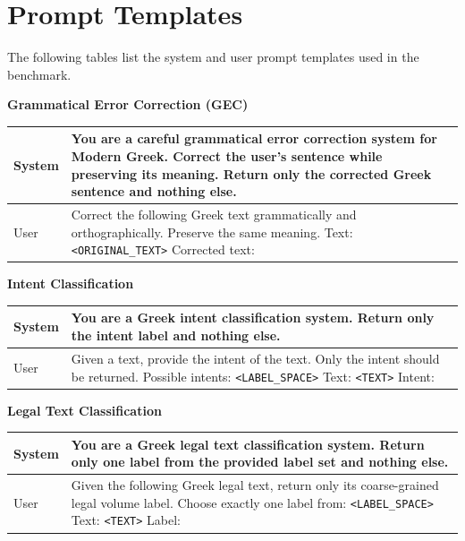 \documentclass[sigconf,review,anonymous]{acmart}
\begin{document}
\section{Prompt Templates}

The following tables list the system and user prompt templates used in the benchmark.

\begin{center}
\textbf{Grammatical Error Correction (GEC)}\par\smallskip
\small
\begin{tabularx}{\columnwidth}{p{}X}
\toprule
System & You are a careful grammatical error correction system for Modern Greek. Correct the user's sentence while preserving its meaning. Return only the corrected Greek sentence and nothing else. \\
\midrule
User & Correct the following Greek text grammatically and orthographically. Preserve the same meaning. \newline
Text: \texttt{<ORIGINAL\_TEXT>} \newline
Corrected text: \\
\bottomrule
\end{tabularx}
\end{center}

\begin{center}
\textbf{Intent Classification}\par\smallskip
\small
\begin{tabularx}{\columnwidth}{p{}X}
\toprule
System & You are a Greek intent classification system. Return only the intent label and nothing else. \\
\midrule
User & Given a text, provide the intent of the text. Only the intent should be returned. \newline
Possible intents: \texttt{<LABEL\_SPACE>} \newline
Text: \texttt{<TEXT>} \newline
Intent: \\
\bottomrule
\end{tabularx}
\end{center}

\begin{center}
\textbf{Legal Text Classification}\par\smallskip
\small
\begin{tabularx}{\columnwidth}{p{}X}
\toprule
System & You are a Greek legal text classification system. Return only one label from the provided label set and nothing else. \\
\midrule
User & Given the following Greek legal text, return only its coarse-grained legal volume label. Choose exactly one label from: \texttt{<LABEL\_SPACE>} \newline
Text: \texttt{<TEXT>} \newline
Label: \\
\bottomrule
\end{tabularx}
\end{center}
\end{document}
